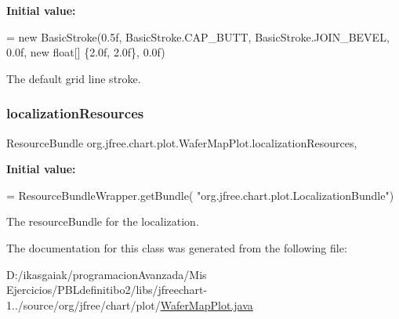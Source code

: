 {\bfseries Initial value\+:}
\begin{DoxyCode}
= \textcolor{keyword}{new} BasicStroke(0.5f,
        BasicStroke.CAP\_BUTT,
        BasicStroke.JOIN\_BEVEL,
        0.0f,
        \textcolor{keyword}{new} \textcolor{keywordtype}{float}[] \{2.0f, 2.0f\},
        0.0f)
\end{DoxyCode}
The default grid line stroke. \mbox{\label{classorg_1_1jfree_1_1chart_1_1plot_1_1_wafer_map_plot_af2d4e785c9b91c8833540bda1f812583}} 
\subsubsection{\texorpdfstring{localization\+Resources}{localizationResources}}
{\footnotesize\ttfamily Resource\+Bundle org.\+jfree.\+chart.\+plot.\+Wafer\+Map\+Plot.\+localization\+Resources\hspace{0.3cm}{\ttfamily [static]}, {\ttfamily [protected]}}

{\bfseries Initial value\+:}
\begin{DoxyCode}
= ResourceBundleWrapper.getBundle(
                    \textcolor{stringliteral}{"org.jfree.chart.plot.LocalizationBundle"})
\end{DoxyCode}
The resource\+Bundle for the localization. 

The documentation for this class was generated from the following file\+:\begin{DoxyCompactItemize}
\item 
D\+:/ikasgaiak/programacion\+Avanzada/\+Mis Ejercicios/\+P\+B\+Ldefinitibo2/libs/jfreechart-\/1../source/org/jfree/chart/plot/\mbox{\hyperlink{_wafer_map_plot_8java}{Wafer\+Map\+Plot.\+java}}\end{DoxyCompactItemize}
